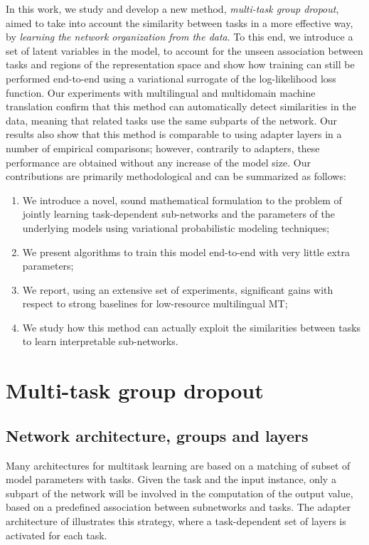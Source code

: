 \documentclass[11pt]{article}
\newcommand{\fyDone}[1]{\done[FY]\Todo[FY:]{\textcolor{orange}{#1}}}
\begin{document}
In this work, we study and develop a new method, \emph{multi-task group dropout}, aimed to take into account the similarity between tasks in a more effective way, by \emph{learning the network organization from the data}. To this end, we introduce a set of latent variables in the model, to account for the unseen association between tasks and regions of the representation space and show how training can still be performed end-to-end using a variational surrogate of the log-likelihood loss function. Our experiments with multilingual and multidomain machine translation confirm that this method can automatically detect similarities in the data, meaning that related tasks use the same subparts of the network. Our results also show that this method is comparable to using adapter layers in a number of empirical comparisons; however, contrarily to adapters, these performance are obtained without any increase of the model size. Our contributions are primarily methodological and can be summarized as follows:
\begin{enumerate}
  \setlength{\itemsep}{1pt}
  \setlength{\parskip}{0pt}
  \setlength{\parsep}{0pt}
\item We introduce a novel, sound mathematical formulation to the problem of jointly learning task-dependent sub-networks and the parameters of the underlying models using variational probabilistic modeling techniques;
\item We present algorithms to train this model end-to-end with very little extra parameters;
\item We report, using an extensive set of experiments, significant gains with respect to strong baselines for low-resource multilingual MT;
\item We study how this method can actually exploit the similarities between tasks to learn interpretable sub-networks.
\end{enumerate}
\fyDone{Can you do distillation ? That is only keep the parameter for one domain and still get good results (better than DA ?)}

\section{Multi-task group dropout \label{sec:architecture}}
\subsection{Network architecture, groups and layers}
Many architectures for multitask learning are based on a matching of subset of model parameters with tasks. Given the task and the input instance, only a subpart of the network will be involved in the computation of the output value, based on a predefined association between subnetworks and tasks. The adapter architecture of \citep{Bapna19simple} illustrates this strategy, where a task-dependent set of layers is activated for each task. 
\end{document}
